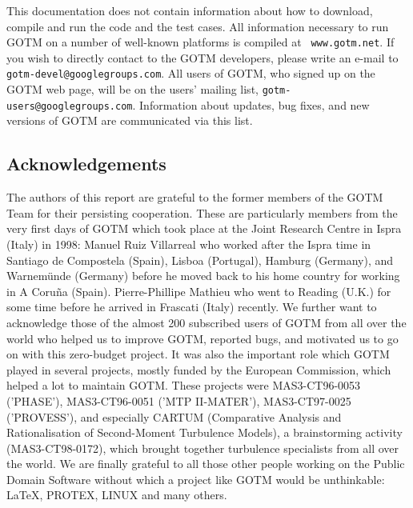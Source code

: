 This documentation does not contain information about how to download,
compile and run the code and the test cases. All information necessary
to run GOTM on a number of well-known platforms is compiled at {\tt
www.gotm.net}. If you wish to directly contact to the GOTM developers,
please write an e-mail to {\tt gotm-devel@googlegroups.com}. All users 
of GOTM, who signed up on the GOTM web page, will be on the users' mailing
list, {\tt gotm-users@googlegroups.com}. Information about updates, 
bug fixes, and new versions of GOTM are communicated via this list.

\subsection{Acknowledgements}

The authors of this report are grateful to the former members of the
GOTM Team for their persisting cooperation. These are particularly
members from the very first days of GOTM which took place at the Joint
Research Centre in Ispra (Italy) in 1998: Manuel Ruiz Villarreal who
worked after the Ispra time in Santiago de Compostela (Spain), Lisboa
(Portugal), Hamburg (Germany), and Warnem\"unde (Germany) before he
moved back to his home country for working in A Coru\~na
(Spain). Pierre-Phillipe Mathieu who went to Reading (U.K.) for some
time before he arrived in Frascati (Italy) recently.  We further want
to acknowledge those of the almost 200 subscribed users of GOTM from
all over the world who helped us to improve GOTM, reported bugs, and
motivated us to go on with this zero-budget project.  It was also the
important role which GOTM played in several projects, mostly funded by
the European Commission, which helped a lot to maintain GOTM.  These
projects were MAS3-CT96-0053 ('PHASE'), MAS3-CT96-0051 ('MTP
II-MATER'), MAS3-CT97-0025 ('PROVESS'), and especially CARTUM
(Comparative Analysis and Rationalisation of Second-Moment Turbulence
Models), a brainstorming activity (MAS3-CT98-0172), which brought
together turbulence specialists from all over the world.  We are
finally grateful to all those other people working on the Public
Domain Software without which a project like GOTM would be
unthinkable: \LaTeX, PROTEX, LINUX and many others.
